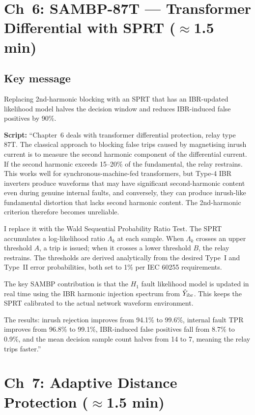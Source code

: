 \documentclass[11pt,a4paper]{article}
\newcommand{\script}[1]{\begin{scriptbox}\textbf{Script:} #1\end{scriptbox}}
\begin{document}
\section{Ch~6: SAMBP-87T --- Transformer Differential with SPRT \hfill\normalfont\small($\approx$1.5 min)}
\label{slide:87t}

\subsection*{Key message}
Replacing 2nd-harmonic blocking with an SPRT that has an IBR-updated likelihood model
halves the decision window and reduces IBR-induced false positives by 90\%.

\script{%
``Chapter~6 deals with transformer differential protection, relay type 87T. The
classical approach to blocking false trips caused by magnetising inrush current is to
measure the second harmonic component of the differential current. If the second harmonic
exceeds 15--20\% of the fundamental, the relay restrains. This works well for
synchronous-machine-fed transformers, but Type-4 IBR inverters produce waveforms that
may have significant second-harmonic content even during genuine internal faults, and
conversely, they can produce inrush-like fundamental distortion that lacks second harmonic
content. The 2nd-harmonic criterion therefore becomes unreliable.

I replace it with the Wald Sequential Probability Ratio Test. The SPRT accumulates a
log-likelihood ratio $\Lambda_k$ at each sample. When $\Lambda_k$ crosses an upper
threshold $A$, a trip is issued; when it crosses a lower threshold $B$, the relay
restrains. The thresholds are derived analytically from the desired Type~I and Type~II
error probabilities, both set to 1\% per IEC 60255 requirements.

The key SAMBP contribution is that the $H_1$ fault likelihood model is updated in real
time using the IBR harmonic injection spectrum from $\hat{Y}_{\rm ibr}$. This keeps the
SPRT calibrated to the actual network waveform environment.

The results: inrush rejection improves from 94.1\% to 99.6\%, internal fault TPR
improves from 96.8\% to 99.1\%, IBR-induced false positives fall from 8.7\% to 0.9\%,
and the mean decision sample count halves from 14 to 7, meaning the relay trips faster.''%
}

\section{Ch~7: Adaptive Distance Protection \hfill\normalfont\small($\approx$1.5 min)}
\label{slide:dist}
\end{document}
